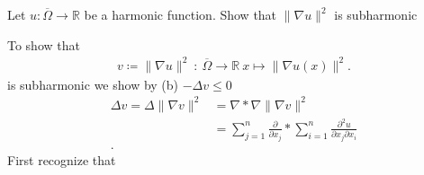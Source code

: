 \begin{question}[c]
 Let $u : \overline{\Omega } \to  \mathbb{R} $  be a harmonic function. Show that $\|\nabla u\|^2$ is subharmonic
\end{question}
\begin{solution}
 To show that 
 \begin{align*}
  v \coloneqq  \|\nabla u \|^2 \ : \ \overline{\Omega } \to  \mathbb{R} \ x \mapsto \|\nabla u(x)\|^2 
 .\end{align*}
 is subharmonic we show by (b)  $-\Delta v \le 0$ 
 \begin{align*}
   \Delta v =  \Delta \|\nabla v\|^2 &= \nabla * \nabla \|\nabla v\|^2 \\
                                     &=  \sum_{j=1}^{n} \frac{\partial}{\partial x_j} * \sum_{i=1}^{n} \frac{\partial ^2 u}{\partial x_j \partial x_i}  \\
 .\end{align*}
 First recognize that 
\end{solution}


